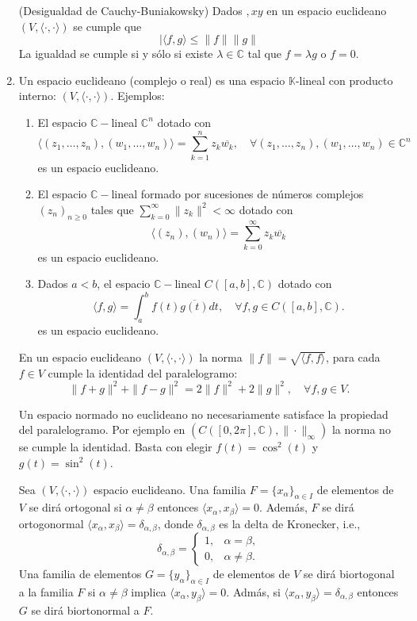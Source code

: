\documentclass[twoside,12pt,a4 paper,openright]{book}
\begin{document}
\begin{enumerate}
(Desigualdad de Cauchy-Buniakowsky)  Dados $,x y $ en un espacio euclideano $(V, \langle \cdot,  \cdot\rangle)$ se cumple que 
$$  | \langle f, g \rangle \leq \|f \| \|g \|  $$
La igualdad se cumple si y s\'olo si   existe $\lambda \in \mathbb C$ tal que $f=\lambda g$ o $f=0$.
 

\item  Un espacio euclideano (complejo o real) es una espacio $\mathbb K$-lineal con producto interno:  $(V, \langle \cdot,  \cdot\rangle)$. Ejemplos:

\begin{enumerate}
\item El espacio $\mathbb C-$lineal  $\mathbb C^n$ dotado con  $$\langle (z_1, \dots, z_n ), (w_1, \dots, w_n) \rangle= \sum_{k=1}^n  z_k \overline{w_k}, \quad \forall  (z_1, \dots, z_n ), (w_1, \dots, w_n) \in \mathbb C^n$$
es un espacio euclideano. 
\item    El espacio $\mathbb C-$lineal  formado por sucesiones de n\'umeros complejos $(z_n)_{n\geq 0}$ tales que  
 $\sum_{k=0}^{\infty } \|z_k\|^2<  \infty $   dotado con  $$\langle (  z_n ), (  w_n) \rangle= \sum_{k=0}^\infty  z_k\overline{  w_k} $$
es un espacio euclideano. 
\item  Dados $a< b$,  el espacio $\mathbb C-$lineal $ C([a,b], \mathbb C)$ dotado con  
$$\langle f,g \rangle= \int_a^b f(t) \overline{ g(t)} dt  , \quad \forall  f,g \in C([a,b], \mathbb C).$$
es un espacio euclideano. 
\end{enumerate}


 En un espacio euclideano  $(V, \langle \cdot,  \cdot\rangle)$ la norma    $ \|f\| = \sqrt{  \langle f, f \rangle  } $, para cada  $f\in V $ cumple la identidad del paralelogramo: 
$$   \| f+g\|^2 + \| f-g\|^2 = 2\| f \|^2 + 2 \| g\|^2 ,\quad \forall f,g \in V .   $$



  
Un espacio normado no euclideano no necesariamente satisface la propiedad del paralelogramo. Por ejemplo en
 $(C([0, 2\pi], \mathbb C), \|\cdot\|_{\infty}) $   la norma no se cumple la identidad.  Basta con elegir $f(t)= \cos^2(t)$ y 
 $g(t)= \sin^2(t)$. 
 

Sea   $(V, \langle \cdot,  \cdot\rangle)$ espacio euclideano. Una familia $F=\{ x_{\alpha}\}_{\alpha\in I}$ de elementos de $V$ se dir\'a   ortogonal  si   $  \alpha \neq  \beta$ entonces 
$\langle x_{\alpha},x_{\beta}\rangle=0$. Adem\'as,   $F $ se dir\'a   ortogonormal  
$\langle x_{\alpha},x_{\beta}\rangle=\delta_{\alpha,\beta}$, donde $\delta_{\alpha,\beta}$ es la delta de Kronecker, i.e., 
$$\delta_{\alpha,\beta}  = \left\{ \begin{array}{ll} 1, & \alpha =\beta, \\  0, & \alpha \neq \beta.    \end{array}\right. $$
Una familia de elementos  $G=\{ y_{\alpha}\}_{\alpha\in I}$ de elementos de $V$ se dir\'a   biortogonal  a la familia $F$ si   $  \alpha \neq  \beta$ implica  
$\langle x_{\alpha},y_{\beta}\rangle=0$.  Adm\'as, si $\langle x_{\alpha},y_{\beta}\rangle=\delta_{\alpha,  \beta}$
 entonces  $G $ se dir\'a   biortonormal   a   $F$. 





\end{enumerate}
\end{document}
